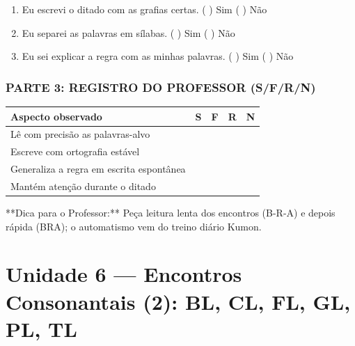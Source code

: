 \begin{exercicio}
\begin{enumerate}[label=\alph*)]
  \item Eu escrevi o ditado com as grafias certas.  \quad ( ) Sim   ( ) Não

  \item Eu separei as palavras em sílabas.  \quad ( ) Sim   ( ) Não

  \item Eu sei explicar a regra com as minhas palavras.  \quad ( ) Sim   ( ) Não

\end{enumerate}

\subsection*{PARTE 3: REGISTRO DO PROFESSOR (S/F/R/N)}

\begin{center}
\renewcommand{\arraystretch}{1.4}
\begin{tabular}{@{}p{9cm}cccc@{}}
\toprule
Aspecto observado & S & F & R & N \\
\midrule
Lê com precisão as palavras-alvo & & & & \\
Escreve com ortografia estável & & & & \\
Generaliza a regra em escrita espontânea & & & & \\
Mantém atenção durante o ditado & & & & \\
\bottomrule\end{tabular}\end{center}

\end{exercicio}

\begin{dica}
**Dica para o Professor:** Peça leitura lenta dos encontros (B-R-A) e depois rápida (BRA); o automatismo vem do treino diário Kumon.
\end{dica}



\chapter{Unidade 6 --- Encontros Consonantais (2): BL, CL, FL, GL, PL, TL}


